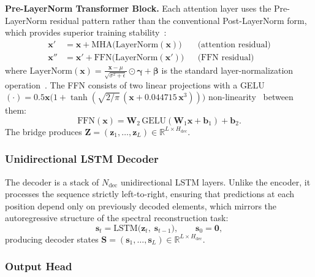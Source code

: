 \documentclass[12pt,a4paper]{report}
\begin{document}
\textbf{Pre-LayerNorm Transformer Block.}  Each attention layer uses the Pre-LayerNorm residual pattern rather than the conventional Post-LayerNorm form, which provides superior training stability~\cite{preln}:
\begin{align}
  \mathbf{x}' &= \mathbf{x} + \text{MHA}\!\big(\text{LayerNorm}(\mathbf{x})\big) && \text{(attention residual)} \label{eq:prenorm_attn} \\
  \mathbf{x}'' &= \mathbf{x}' + \text{FFN}\!\big(\text{LayerNorm}(\mathbf{x}')\big) && \text{(FFN residual)} \label{eq:prenorm_ffn}
\end{align}
where $\text{LayerNorm}(\mathbf{x}) = \frac{\mathbf{x} - \mu}{\sqrt{\sigma^2 + \epsilon}} \odot \boldsymbol{\gamma} + \boldsymbol{\beta}$ is the standard layer-normalization operation~\cite{layernorm}.  The FFN consists of two linear projections with a GELU$(\cdot) = 0.5\mathbf{x}\big(1 + \tanh(\sqrt{2/\pi}\,(\mathbf{x} + 0.044715\,\mathbf{x}^3))\big)$ non-linearity~\cite{gelu} between them:
\begin{equation}
  \text{FFN}(\mathbf{x}) = \mathbf{W}_2\,\text{GELU}(\mathbf{W}_1\mathbf{x} + \mathbf{b}_1) + \mathbf{b}_2.
  \label{eq:ffn}
\end{equation}
The bridge produces $\mathbf{Z} = (\mathbf{z}_1, \dots, \mathbf{z}_L) \in \mathbb{R}^{L \times H_{\mathrm{dec}}}$.

\bigskip
\subsubsection{Unidirectional LSTM Decoder}

The decoder is a stack of $N_{\mathrm{dec}}$ unidirectional LSTM layers.  Unlike the encoder, it processes the sequence strictly left-to-right, ensuring that predictions at each position depend only on previously decoded elements, which mirrors the autoregressive structure of the spectral reconstruction task:
\begin{equation}
  \mathbf{s}_t = \text{LSTM}\!\big(\mathbf{z}_t,\; \mathbf{s}_{t-1}\big), \qquad \mathbf{s}_0 = \mathbf{0},
  \label{eq:decoder_lstm}
\end{equation}
producing decoder states $\mathbf{S} = (\mathbf{s}_1, \dots, \mathbf{s}_L) \in \mathbb{R}^{L \times H_{\mathrm{dec}}}$.

\bigskip
\subsubsection{Output Head}
\end{document}

